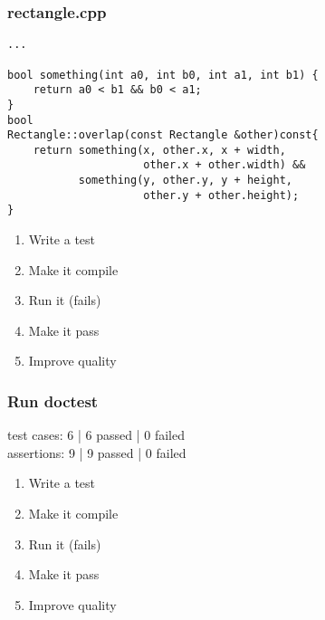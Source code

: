 \begin{frame}[fragile]
\frametitle{rectangle.cpp}
\begin{minipage}[t]{0.48\linewidth}
\begin{lstlisting}
...

bool something(int a0, int b0, int a1, int b1) {
    return a0 < b1 && b0 < a1;
}
bool 
Rectangle::overlap(const Rectangle &other)const{
    return something(x, other.x, x + width, 
                     other.x + other.width) &&
           something(y, other.y, y + height,
                     other.y + other.height);
}
\end{lstlisting}
\end{minipage}\hfill
\begin{minipage}[t]{0.28\linewidth}
  \small
  \begin{enumerate} 
    \item \textcolor{deadcolor}{Write a test}
    \item \textcolor{deadcolor}{Make it compile}
    \item \textcolor{deadcolor}{Run it (fails)}
    \item \textcolor{deadcolor}{Make it pass}
    \item \textcolor{activecolor}{Improve quality}
  \end{enumerate} 
\end{minipage}
\end{frame}

\begin{frame}[fragile]
\frametitle{Run doctest}
\begin{minipage}[t]{0.48\linewidth}
test cases: 6 | 6 passed | 0 failed\\
assertions: 9 | 9 passed | 0 failed\\
\end{minipage}\hfill
\begin{minipage}[t]{0.28\linewidth}
  \small
  \begin{enumerate} 
    \item \textcolor{deadcolor}{Write a test}
    \item \textcolor{deadcolor}{Make it compile}
    \item \textcolor{deadcolor}{Run it (fails)}
    \item \textcolor{deadcolor}{Make it pass}
    \item \textcolor{activecolor}{Improve quality}
  \end{enumerate} 
\end{minipage}
\end{frame}

